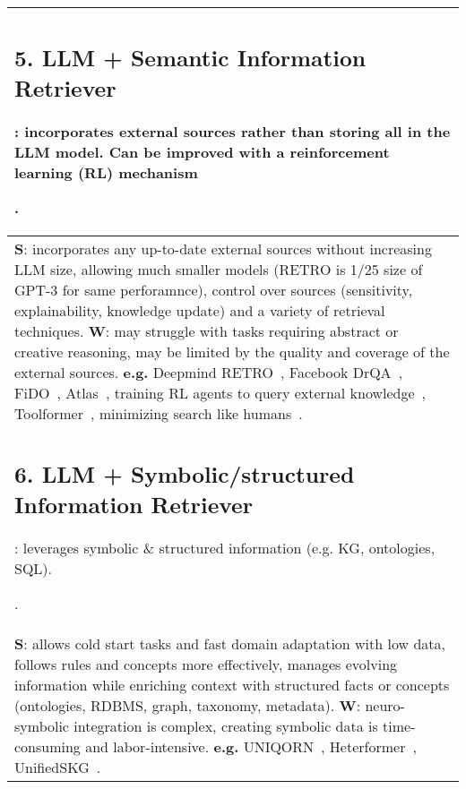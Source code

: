 \documentclass[acmsmall]{acmart}
\begin{document}
{\begin{longtable}{p{1\linewidth}}
{\subsection{5. LLM + Semantic Information Retriever}\label{HP5}:
incorporates external sources rather than storing all in the LLM model. Can be improved with a reinforcement learning (RL) mechanism}. \\\midrule  
{\textbf{S}: incorporates any up-to-date external sources without increasing LLM size, allowing much smaller models (RETRO is 1/25 size of GPT-3 for same perforamnce), control over sources (sensitivity, explainability, knowledge update) and a variety of retrieval techniques.
 \newline \textbf{W}:} may struggle with tasks requiring abstract or creative reasoning, may be limited by the quality and coverage of the external sources.
 \newline \textbf{e.g.} Deepmind RETRO~\citep{borgeaudImprovingLanguageModels2022}, Facebook DrQA~\citep{chenReadingWikipediaAnswer2017}, FiDO~\citep{dejongFiDOFusioninDecoderOptimized2022}, Atlas~\citep{izacardAtlasFewshotLearning2022}, training RL agents to query external knowledge~\citep{liuAskingKnowledgeTraining2022}, Toolformer~\citep{schickToolformerLanguageModels2023}, minimizing search like humans~\citep{varshneyCanOpenDomainQA2022, sungOptimizingTestTimeQuery2022}. \\\midrule

{\subsection{6. LLM + Symbolic/structured Information Retriever}\label{HP6}:
leverages symbolic \& structured information (e.g. KG, ontologies, SQL). }. \\\midrule  
{\textbf{S}: allows cold start tasks and fast domain adaptation with low data, follows rules and concepts more effectively, manages evolving information while enriching context with structured facts or concepts (ontologies, RDBMS, graph, taxonomy, metadata).
 \newline \textbf{W}:} neuro-symbolic integration is complex, creating symbolic data is time-consuming and labor-intensive.
 \newline \textbf{e.g.} UNIQORN~\citep{pramanikUNIQORNUnifiedQuestion2022}, Heterformer~\citep{jinHeterformerTransformerArchitecture2022}, UnifiedSKG~\citep{xieUnifiedSKGUnifyingMultiTasking2022}. \\\midrule


\end{longtable}}
\end{document}
